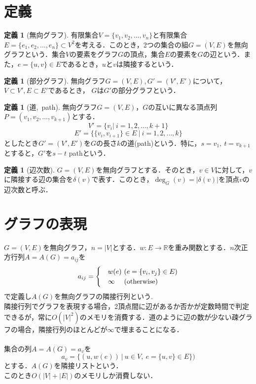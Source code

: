 \documentclass[a4paper,12pt]{jsreport}
\theoremstyle{definition}
\newtheorem{definition}[theorem]{定義}
\begin{document}
\section{定義}
\begin{definition}[無向グラフ]
    有限集合$V=\{v_1,v_2,\ldots,v_n\}$と有限集合$E=\{e_1,e_2,\ldots,e_n\}\subset V^2$を考える．このとき，2つの集合の組$G=(V,E)$を無向グラフという．集合$V$の要素をグラフ$G$の頂点，集合$E$の要素を$G$の辺という．また，$e=\{u,v\}\in E$であるとき，$u$と$v$は隣接するという．
\end{definition}
\begin{definition}[部分グラフ]
    無向グラフ$G=(V,E),G'=(V',E')$について，$V\subset V',E\subset E'$であるとき， $G$は$G'$の部分グラフという．
\end{definition}
\begin{definition}[道,\ path]
    無向グラフ$G=(V,E)$，$G$の互いに異なる頂点列$P=(v_1,v_2,\ldots, v_{k+1})$とする．
    \begin{equation}
        V'=\{v_i|\ i=1,2,\ldots,k+1\}
    \end{equation}
    \begin{equation}
        E'=\{\{v_i,v_{i+1}\}\in E\ |\ i=1,2,\ldots,k\}
    \end{equation}
    としたとき$G'=(V',E')$を$G$の長さ$k$の道(path)という．特に，$s=v_1,\ t=v_{k+1}$とすると，$G'$を$s-t$ pathという．
\end{definition}
\begin{definition}[辺次数]
    $G=(V,E)$を無向グラフとする．そのとき，$v\in V$に対して，$v$に隣接する辺の集合を$\delta(v)$で表す．このとき，$\deg_G(v)=|\delta(v)|$を頂点$ v$の辺次数と呼ぶ．
\end{definition}
\section{グラフの表現}
$G=(V,E)$を無向グラフ，$n=|V|$とする．$w:E\to \mathbb{R}$を重み関数とする．$n$次正方行列$A=A(G)=a_{ij}$を
\begin{eqnarray}
    a_{ij}=
    \begin{cases}
        & w(e)\ (e=\{v_i,v_j\}\in E)\\
        & \infty\ \ \ \ ({\rm otherwise})
    \end{cases}
\end{eqnarray}
で定義し$A(G)$を無向グラフの隣接行列という.\\
隣接行列でグラフを表現する場合，2頂点間に辺があるか否かが定数時間で判定できるが，常に$O(|V|^2)$のメモリを消費する．道のように辺の数が少ない疎グラフの場合，隣接行列のほとんどが$\infty$で埋まることになる．\\ \\
集合の列$A=A(G)=a_v$を
\begin{equation}
    a_v=\{(u,w(e))\ |\ u\in V,\ e=\{u,v\}\in E \})
\end{equation}
とする．$A(G)$を隣接リストという．\\
このとき$O(|V|+|E|)$のメモリしか消費しない．
\end{document}
